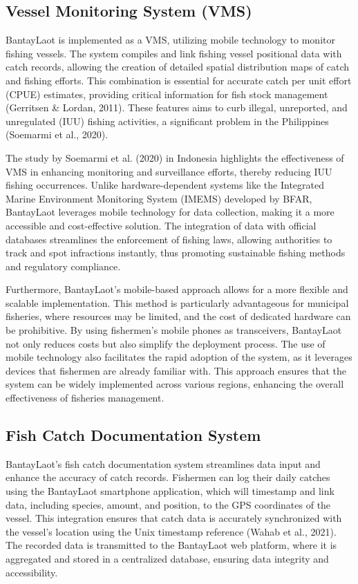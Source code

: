 \documentclass[journal]{IEEEtran}
\begin{document}
\subsection{Vessel Monitoring System (VMS)}
BantayLaot is implemented as a VMS, utilizing mobile technology to monitor fishing vessels. The system compiles and link fishing vessel positional data with catch records, allowing the creation of detailed spatial distribution maps of catch and fishing efforts. This combination is essential for accurate catch per unit effort (CPUE) estimates, providing critical information for fish stock management (Gerritsen \& Lordan, 2011). These features aims to curb illegal, unreported, and unregulated (IUU) fishing activities, a significant problem in the Philippines (Soemarmi et al., 2020).

The study by Soemarmi et al. (2020) in Indonesia highlights the effectiveness of VMS in enhancing monitoring and surveillance efforts, thereby reducing IUU fishing occurrences. Unlike hardware-dependent systems like the Integrated Marine Environment Monitoring System (IMEMS) developed by BFAR, BantayLaot leverages mobile technology for data collection, making it a more accessible and cost-effective solution. The integration of data with official databases streamlines the enforcement of fishing laws, allowing authorities to track and spot infractions instantly, thus promoting sustainable fishing methods and regulatory compliance.

Furthermore, BantayLaot's mobile-based approach allows for a more flexible and scalable implementation. This method is particularly advantageous for municipal fisheries, where resources may be limited, and the cost of dedicated hardware can be prohibitive. By using fishermen's mobile phones as transceivers, BantayLaot not only reduces costs but also simplify the deployment process. The use of mobile technology also facilitates the rapid adoption of the system, as it leverages devices that fishermen are already familiar with. This approach ensures that the system can be widely implemented across various regions, enhancing the overall effectiveness of fisheries management.
\subsection{Fish Catch Documentation System}
BantayLaot's fish catch documentation system streamlines data input and enhance the accuracy of catch records. Fishermen can log their daily catches using the BantayLaot smartphone application, which will timestamp and link data, including species, amount, and position, to the GPS coordinates of the vessel. This integration ensures that catch data is accurately synchronized with the vessel’s location using the Unix timestamp reference (Wahab et al., 2021). The recorded data is transmitted to the BantayLaot web platform, where it is aggregated and stored in a centralized database, ensuring data integrity and accessibility.
\end{document}
